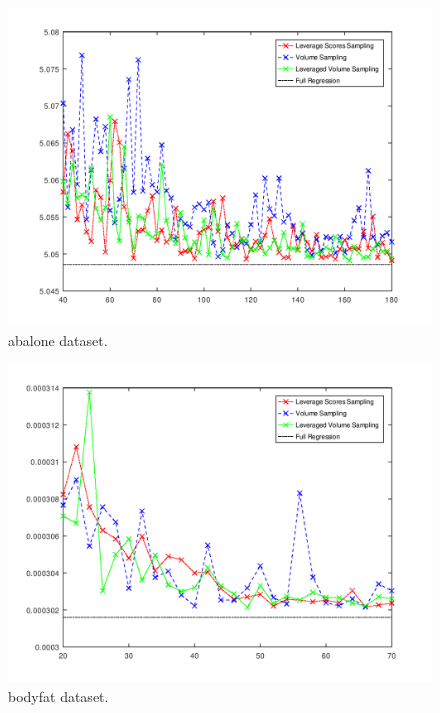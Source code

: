 \documentclass{article}
\begin{document}
        \begin{figure}[h]
            \includegraphics[width=\linewidth]{results/abalone.png}
            \caption{abalone dataset.}
            \label{fig:dataset1}
        \end{figure}
        \begin{figure}[h]
            \includegraphics[width=\linewidth]{results/bodyfat.png}
            \caption{bodyfat dataset.}
            \label{fig:dataset1}
        \end{figure}
\end{document}
